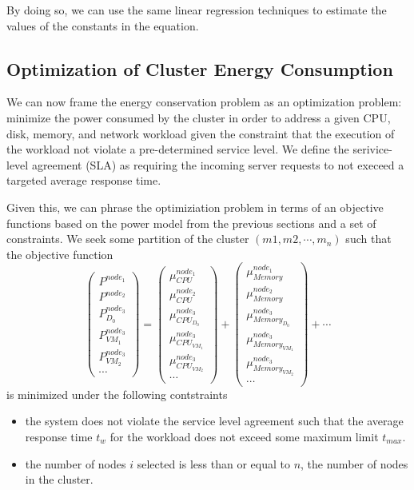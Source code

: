 \documentclass[times, 10pt,twocolumn]{article}
\begin{document}
By doing so, we can use the same linear regression techniques to
estimate the values of the constants in the equation.

\subsection{Optimization of Cluster Energy Consumption}
\label{sec:optimize}
We can now frame the energy conservation problem as an optimization
problem: minimize the power consumed by the cluster in order to address a given
CPU, disk, memory, and network workload given the constraint that the
execution of the workload not violate a pre-determined service
level. We define the serivice-level agreement (SLA) as requiring the
incoming server requests to not execeed a targeted average response time.

Given this, we can phrase the optimiziation problem in terms of an
objective functions based on the power model from the previous sections
and a set of constraints.  We seek some partition of the cluster
$(m1,m2,\dotsb,m_{n})$ such that the objective function 
\begin{equation*}
  \begin{pmatrix}
    P^{node_{1}}\\
    P^{node_{2}}\\
    P_{D_{0}}^{node_{3}}\\
    P_{VM_{1}}^{node_{3}}\\
    P_{VM_{2}}^{node_{3}}\\
    \dotsb
  \end{pmatrix} =
  \begin{pmatrix}
    \mu_{CPU}^{node_{1}}\\
    \mu_{CPU}^{node_{2}}\\
    \mu_{CPU_{D_{0}}}^{node_{3}}\\
    \mu_{CPU_{VM_{1}}}^{node_{3}}\\
    \mu_{CPU_{VM_{2}}}^{node_{3}}\\
    \dotsb
  \end{pmatrix} +
  \begin{pmatrix}
    \mu_{Memory}^{node_{1}}\\
    \mu_{Memory}^{node_{2}}\\
    \mu_{Memory_{D_{0}}}^{node_{3}}\\
    \mu_{Memory_{VM_{1}}}^{node_{3}}\\
    \mu_{Memory_{VM_{2}}}^{node_{3}}\\
    \dotsb
  \end{pmatrix} +
\dotsb
\end{equation*}
is minimized under the following contstraints
\begin{itemize}
\item the system does not violate the service level agreement such that
  the average response time $t_{w}$ for the workload does not exceed
  some maximum limit $t_{max}$.
\item the number of nodes $i$ selected is less than or equal to $n$, the
  number of nodes in the cluster.
\end{itemize}
\end{document}
